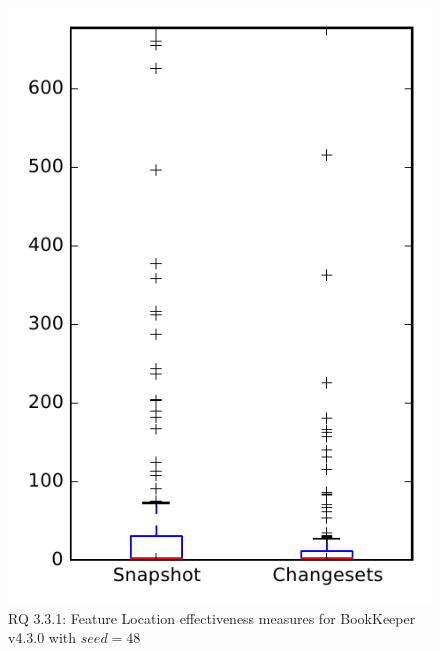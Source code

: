 
\begin{figure}
\centering
\includegraphics[height=0.4\textheight]{figures/flt_seed/rq1_bookkeeper_48}
\caption{RQ 3.3.1: Feature Location effectiveness measures for BookKeeper v4.3.0 with $seed=48$}
\label{fig:flt_seed:rq1:bookkeeper}
\end{figure}
